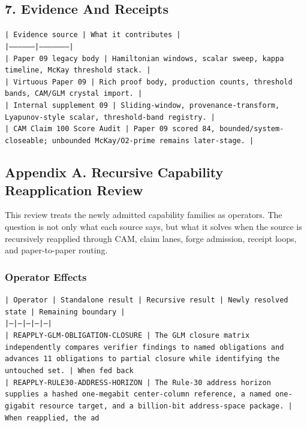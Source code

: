 \documentclass[11pt]{article}
\begin{document}
\subsection*{7. Evidence And Receipts}

\noindent\texttt{| Evidence source | What it contributes |}\\
\noindent\texttt{|-----------------|---------------------|}\\
\noindent\texttt{| Paper 09 legacy body | Hamiltonian windows, scalar sweep, kappa timeline, McKay threshold stack. |}\\
\noindent\texttt{| Virtuous Paper 09 | Rich proof body, production counts, threshold bands, CAM/GLM crystal import. |}\\
\noindent\texttt{| Internal supplement 09 | Sliding-window, provenance-transform, Lyapunov-style scalar, threshold-band registry. |}\\
\noindent\texttt{| CAM Claim 100 Score Audit | Paper 09 scored 84, bounded/system-closeable; unbounded McKay/O2-prime remains later-stage. |}\\

\subsection*{Appendix A. Recursive Capability Reapplication Review}

This review treats the newly admitted capability families as operators. The question is not only what each source says, but what it solves when the source is recursively reapplied through CAM, claim lanes, forge admission, receipt loops, and paper-to-paper routing.

\subsubsection*{Operator Effects}

\noindent\texttt{| Operator | Standalone result | Recursive result | Newly resolved state | Remaining boundary |}\\
\noindent\texttt{|---|---|---|---|---|}\\
\noindent\texttt{| REAPPLY-GLM-OBLIGATION-CLOSURE | The GLM closure matrix independently compares verifier findings to named obligations and advances 11 obligations to partial closure while identifying the untouched set. | When fed back }\\
\noindent\texttt{| REAPPLY-RULE30-ADDRESS-HORIZON | The Rule-30 address horizon supplies a hashed one-megabit center-column reference, a named one-gigabit resource target, and a billion-bit address-space package. | When reapplied, the ad}\\
\end{document}
